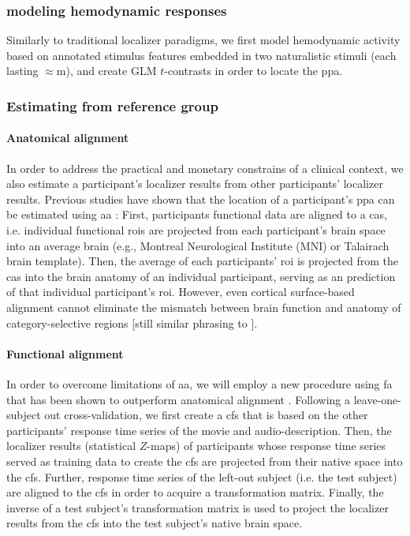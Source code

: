 \subsubsection{modeling hemodynamic responses}
%
Similarly to traditional localizer paradigms, we first model hemodynamic
activity based on annotated stimulus features embedded in two naturalistic
stimuli (each lasting $\approx$\unit[120]{m}), and create GLM $t$-contrasts in
order to locate the \ac{ppa}.


\subsubsection{Estimating from reference group}

\paragraph{Anatomical alignment}
In order to address the practical and monetary constrains of a clinical context,
we also estimate a participant's localizer results from other participants'
localizer results.
Previous studies have shown that the location of a participant's \ac{ppa} can be
estimated using \ac{aa} \citep{frost2012measuring, rosenke2021probabilistic,
weiner2018defining, zhen2017quantifying}:
%
First, participants functional data are aligned to a \ac{cas}, i.e. individual
functional \acp{roi} are projected from each participant's brain space into an
average brain (e.g., Montreal Neurological Institute (MNI) \citep{evans1993mni}
or Talairach brain template).
%
Then, the average of each participants' \ac{roi} is projected from the \ac{cas}
into the brain anatomy of an individual participant, serving as an prediction of
that individual participant's \ac{roi}.
%
However, even cortical surface-based alignment \citep{fischl2012freesurfer}
cannot eliminate the mismatch between brain function and anatomy of
category-selective regions \citep{duncan2009consistency, frost2012measuring,
weiner2018defining, weiner2014mid} [still similar phrasing to
\citep{feilong2018reliable}].


\paragraph{Functional alignment}
In order to overcome limitations of \ac{aa}, we will employ a new
procedure using \ac{fa} that has been shown to outperform anatomical alignment
\citep{haxby2020hyperalignment, bazeille2021empirical}.
%
%
Following a leave-one-subject out cross-validation, we first create a \ac{cfs}
that is based on the other participants' response time series of the movie and
audio-description.
%
Then, the localizer results (statistical $Z$-maps) of participants whose
response time series served as training data to create the \ac{cfs} are
projected from their native space into the \ac{cfs}.
%
Further, response time series of the left-out subject (i.e. the test subject) are
aligned to the \ac{cfs} in order to acquire a transformation matrix.
%
Finally, the inverse of a test subject's transformation matrix is used to
project the localizer results from the \ac{cfs} into the test subject's native
brain space.


